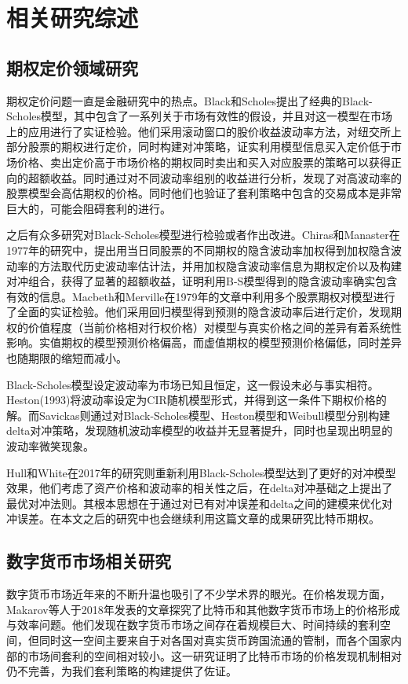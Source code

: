 \chapter{相关研究综述}
\section{期权定价领域研究}
\par{
期权定价问题一直是金融研究中的热点。Black和Scholes提出了经典的Black-Scholes模型\cite{10.2307/1831029}，其中包含了一系列关于市场有效性的假设，并且对这一模型在市场上的应用进行了实证检验\cite{J-1972}。他们采用滚动窗口的股价收益波动率方法，对纽交所上部分股票的期权进行定价，同时构建对冲策略，证实利用模型信息买入定价低于市场价格、卖出定价高于市场价格的期权同时卖出和买入对应股票的策略可以获得正向的超额收益。同时通过对不同波动率组别的收益进行分析，发现了对高波动率的股票模型会高估期权的价格。同时他们也验证了套利策略中包含的交易成本是非常巨大的，可能会阻碍套利的进行。}
\par{
之后有众多研究对Black-Scholes模型进行检验或者作出改进。Chiras和Manaster在1977年的研究中，提出用当日同股票的不同期权的隐含波动率加权得到加权隐含波动率的方法取代历史波动率估计法，并用加权隐含波动率信息为期权定价以及构建对冲组合，获得了显著的超额收益，证明利用B-S模型得到的隐含波动率确实包含有效的信息\cite{CHIRAS1978213}。Macbeth和Merville在1979年的文章中利用多个股票期权对模型进行了全面的实证检验\cite{Jame-1979}。他们采用回归模型得到预测的隐含波动率后进行定价，发现期权的价值程度（当前价格相对行权价格）对模型与真实价格之间的差异有着系统性影响。实值期权的模型预测价格偏高，而虚值期权的模型预测价格偏低，同时差异也随期限的缩短而减小。
}
\par{Black-Scholes模型设定波动率为市场已知且恒定，这一假设未必与事实相符。Heston(1993)将波动率设定为CIR随机模型形式，并得到这一条件下期权价格的解\cite{10.1093/rfs/6.2.327}。而Savickas则通过对Black-Scholes模型、Heston模型和Weibull模型分别构建delta对冲策略，发现随机波动率模型的收益并无显著提升，同时也呈现出明显的波动率微笑现象\cite{Rober-2005}。}
\par{
    Hull和White在2017年的研究则重新利用Black-Scholes模型达到了更好的对冲模型效果，他们考虑了资产价格和波动率的相关性之后，在delta对冲基础之上提出了最优对冲法则\cite{Hull-2017}。其根本思想在于通过对已有对冲误差和delta之间的建模来优化对冲误差。在本文之后的研究中也会继续利用这篇文章的成果研究比特币期权。
}
\section{数字货币市场相关研究}
\par{数字货币市场近年来的不断升温也吸引了不少学术界的眼光。在价格发现方面，Makarov等人于2018年发表的文章探究了比特币和其他数字货币市场上的价格形成与效率问题\cite{Makarov-2018}。他们发现在数字货币市场之间存在着规模巨大、时间持续的套利空间，但同时这一空间主要来自于对各国对真实货币跨国流通的管制，而各个国家内部的市场间套利的空间相对较小。这一研究证明了比特币市场的价格发现机制相对仍不完善，为我们套利策略的构建提供了佐证。
}
